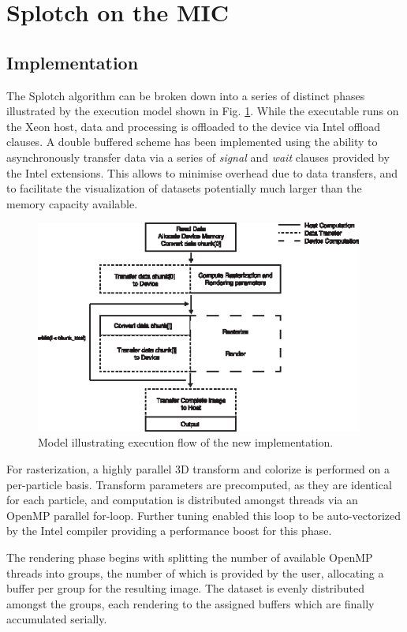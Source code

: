 \documentclass[runningheads,a4paper]{llncs}
\begin{document}
\section{Splotch on the MIC}
\label{sect:micsplotch}


\subsection{Implementation}
\label{sect:micimplementation}


The Splotch algorithm can be broken down into a series of distinct phases illustrated by the execution model shown in Fig. \ref{fig:exmodel}.
While the executable runs on the Xeon host, data and processing is offloaded to the device via Intel offload clauses.
A double buffered scheme has been implemented using the ability to asynchronously transfer data via a series of \emph{signal} 
and \emph{wait} clauses provided by the Intel extensions. This allows to minimise overhead due to data transfers, 
and to facilitate the visualization of datasets potentially much larger than the memory capacity available.

\begin{figure}
\centering
\includegraphics[height=7.0cm]{ExecutionModel}
\caption{Model illustrating execution flow of the new implementation.}
\label{fig:exmodel}
\end{figure}

For rasterization, a highly parallel 3D transform and colorize is performed on a per-particle
basis. Transform parameters are precomputed, as they are identical for each particle, and computation is distributed amongst
threads via an OpenMP parallel for-loop. Further tuning enabled this loop to be auto-vectorized by the Intel compiler providing a 
performance boost for this phase.

The rendering phase begins with splitting the number of available OpenMP threads into groups, the number of which is provided by the 
user, allocating a buffer per group for the resulting image. The dataset is evenly distributed amongst the 
groups, each rendering to the assigned buffers which are finally accumulated serially. 
\end{document}
